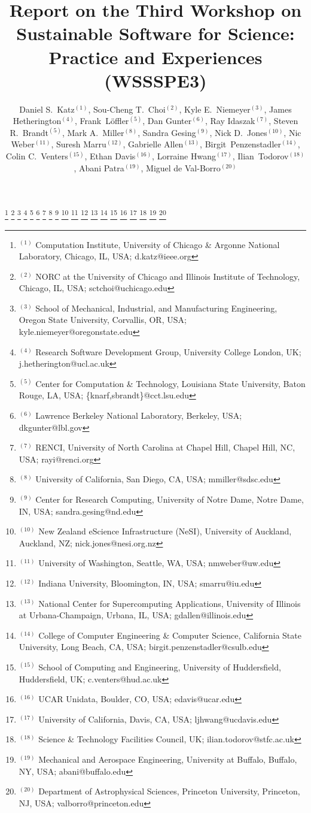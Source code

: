 \documentclass[11pt, oneside]{amsart}
\begin{document}
\title[]{Report on the Third Workshop on Sustainable Software for Science: Practice and Experiences (WSSSPE3)}

\author{Daniel S.\ Katz$^{(1)}$,
Sou-Cheng T.\ Choi$^{(2)}$,
Kyle E.\ Niemeyer$^{(3)}$,
James Hetherington$^{(4)}$,
Frank~L\"{o}ffler$^{(5)}$,
Dan Gunter$^{(6)}$,
Ray Idaszak$^{(7)}$,
Steven R.\ Brandt$^{(5)}$,
Mark A.\ Miller$^{(8)}$,
Sandra Gesing$^{(9)}$,
Nick D.\ Jones$^{(10)}$,
Nic Weber$^{(11)}$,
Suresh Marru$^{(12)}$,
Gabrielle Allen$^{(13)}$,
Birgit~Penzenstadler$^{(14)}$,
Colin C.\ Venters$^{(15)}$,
Ethan Davis$^{(16)}$,
Lorraine Hwang$^{(17)}$,
Ilian~Todorov$^{(18)}$,
Abani Patra$^{(19)}$,
Miguel de Val-Borro$^{(20)}$
}


%
\thanks{{}$^{(1)}$ \hspace{-1ex}Computation Institute, 
University of Chicago \& Argonne National Laboratory, Chicago, IL, USA; d.katz@ieee.org}
%
\thanks{{}$^{(2)}$ NORC at the University of Chicago and Illinois Institute of Technology, Chicago, IL, USA; sctchoi@uchicago.edu}
%
\thanks{{}$^{(3)}$ School of Mechanical, Industrial, and Manufacturing Engineering, 
Oregon State University, Corvallis, OR, USA; kyle.niemeyer@oregonstate.edu}
%
\thanks{{}$^{(4)}$ Research Software Development Group, University College London, UK; j.hetherington@ucl.ac.uk}
%
\thanks{{}$^{(5)}$ \hspace{-1.5ex}Center for Computation \& Technology, Louisiana State University, Baton Rouge, LA, USA; \{knarf,sbrandt\}@cct.lsu.edu}
%
\thanks{{}$^{(6)}$ Lawrence Berkeley National Laboratory, Berkeley, USA; dkgunter@lbl.gov}
%
\thanks{{}$^{(7)}$ RENCI, University of North Carolina at Chapel Hill, Chapel Hill, NC, USA; rayi@renci.org}
%
\thanks{{}$^{(8)}$ University of California, San Diego, CA, USA; mmiller@sdsc.edu}
%
\thanks{{}$^{(9)}$ Center for Research Computing, University of Notre Dame, Notre Dame, IN, USA; sandra.gesing@nd.edu}
%
\thanks{{}$^{(10)}$ New Zealand eScience Infrastructure (NeSI), University of Auckland, Auckland, NZ; nick.jones@nesi.org.nz}
%
\thanks{{}$^{(11)}$ University of Washington, Seattle, WA, USA; nmweber@uw.edu}
%
\thanks{{}$^{(12)}$ Indiana University, Bloomington, IN, USA; smarru@iu.edu}
%
\thanks{{}$^{(13)}$ National Center for Supercomputing Applications, University of Illinois at Urbana-Champaign, Urbana, IL, USA; gdallen@illinois.edu}
%
\thanks{{}$^{(14)}$ College of Computer Engineering \& Computer Science, California State University, Long Beach, CA, USA; birgit.penzenstadler@csulb.edu}
%
\thanks{{}$^{(15)}$ School of Computing and Engineering, University of Huddersfield, Huddersfield, UK; c.venters@hud.ac.uk}
%
\thanks{{}$^{(16)}$ UCAR Unidata, Boulder, CO, USA; edavis@ucar.edu}
%
\thanks{{}$^{(17)}$  University of California, Davis, CA, USA; ljhwang@ucdavis.edu}
%
\thanks{{}$^{(18)}$ Science \& Technology Facilities Council, UK; ilian.todorov@stfc.ac.uk}
%
\thanks{{}$^{(19)}$ Mechanical and Aerospace Engineering, University at Buffalo, Buffalo, NY, USA; abani@buffalo.edu}
%
\thanks{{}$^{(20)}$ Department of Astrophysical Sciences, Princeton University, Princeton, NJ, USA; valborro@princeton.edu}
%
 
\end{document}
